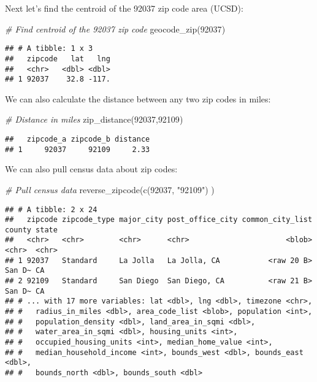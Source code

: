 \documentclass[
]{article}
\newenvironment{Shaded}{\begin{snugshade}}{\end{snugshade}}
\newcommand{\CommentTok}[1]{\textcolor[rgb]{0.56,0.35,0.01}{\textit{#1}}}
\newcommand{\FunctionTok}[1]{\textcolor[rgb]{0.00,0.00,0.00}{#1}}
\newcommand{\NormalTok}[1]{#1}
\newcommand{\StringTok}[1]{\textcolor[rgb]{0.31,0.60,0.02}{#1}}
\begin{document}
Next let's find the centroid of the 92037 zip code area (UCSD):

\begin{Shaded}
\begin{Highlighting}[]
\CommentTok{\# Find centroid of the 92037 zip code}
\FunctionTok{geocode\_zip}\NormalTok{(}\StringTok{\textquotesingle{}92037\textquotesingle{}}\NormalTok{)}
\end{Highlighting}
\end{Shaded}

\begin{verbatim}
## # A tibble: 1 x 3
##   zipcode   lat   lng
##   <chr>   <dbl> <dbl>
## 1 92037    32.8 -117.
\end{verbatim}

We can also calculate the distance between any two zip codes in miles:

\begin{Shaded}
\begin{Highlighting}[]
\CommentTok{\# Distance in miles}
\FunctionTok{zip\_distance}\NormalTok{(}\StringTok{\textquotesingle{}92037\textquotesingle{}}\NormalTok{,}\StringTok{\textquotesingle{}92109\textquotesingle{}}\NormalTok{)}
\end{Highlighting}
\end{Shaded}

\begin{verbatim}
##   zipcode_a zipcode_b distance
## 1     92037     92109     2.33
\end{verbatim}

We can also pull census data about zip codes:

\begin{Shaded}
\begin{Highlighting}[]
\CommentTok{\# Pull census data}
\FunctionTok{reverse\_zipcode}\NormalTok{(}\FunctionTok{c}\NormalTok{(}\StringTok{\textquotesingle{}92037\textquotesingle{}}\NormalTok{, }\StringTok{"92109"}\NormalTok{) )}
\end{Highlighting}
\end{Shaded}

\begin{verbatim}
## # A tibble: 2 x 24
##   zipcode zipcode_type major_city post_office_city common_city_list county state
##   <chr>   <chr>        <chr>      <chr>                      <blob> <chr>  <chr>
## 1 92037   Standard     La Jolla   La Jolla, CA           <raw 20 B> San D~ CA   
## 2 92109   Standard     San Diego  San Diego, CA          <raw 21 B> San D~ CA   
## # ... with 17 more variables: lat <dbl>, lng <dbl>, timezone <chr>,
## #   radius_in_miles <dbl>, area_code_list <blob>, population <int>,
## #   population_density <dbl>, land_area_in_sqmi <dbl>,
## #   water_area_in_sqmi <dbl>, housing_units <int>,
## #   occupied_housing_units <int>, median_home_value <int>,
## #   median_household_income <int>, bounds_west <dbl>, bounds_east <dbl>,
## #   bounds_north <dbl>, bounds_south <dbl>
\end{verbatim}
\end{document}
